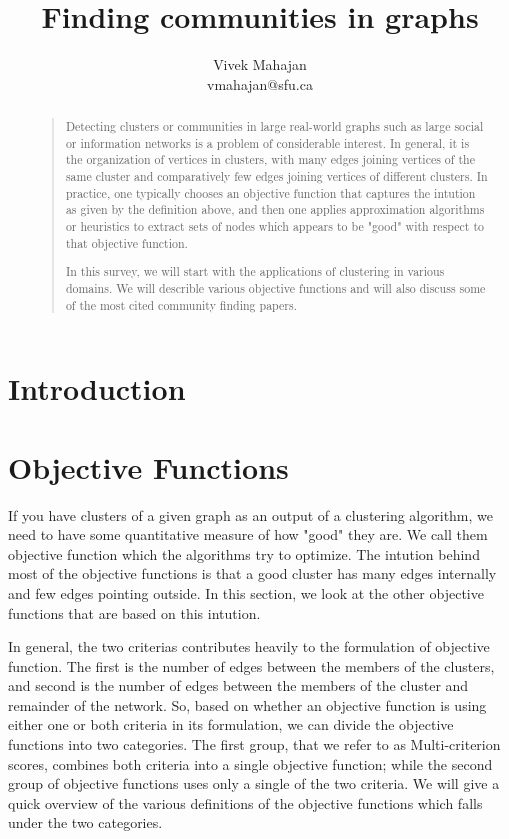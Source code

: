 \documentclass[letterpaper]{article}
\begin{document}
%
\title{Finding communities in graphs}
\author{Vivek Mahajan\\
vmahajan@sfu.ca\\
}
\maketitle
\begin{abstract}
\begin{quote}
Detecting clusters or communities in large real-world graphs such as large social or information networks is a problem of considerable interest. In general, it is the 
organization of vertices in clusters, with many edges joining vertices of the same cluster and comparatively few edges joining vertices of different clusters. 
In practice, one typically chooses an objective function that captures the intution as given by the definition above, and then one applies approximation algorithms
or heuristics to extract sets of nodes which appears to be "good" with respect to that objective function.

In this survey, we will start with the applications of clustering in various domains. We will describle various objective functions and will also discuss some of the
most cited community finding papers. 

\end{quote}
\end{abstract}

\section{Introduction}

\section{Objective Functions}
If you have clusters of a given graph as an output of a clustering algorithm, we need to have some quantitative measure of how "good" they are. We call them objective
function which the algorithms try to optimize. The intution behind most of the objective functions is that a good cluster has many edges internally and few edges 
pointing outside. In this section, we look at the other objective functions that are based on this intution.


In general, the two criterias contributes heavily to the formulation of objective function. The first is the number of edges between the members of the clusters, and 
second is the number of edges between the members of the cluster and remainder of the network. So, based on whether an objective function is using either one or both 
criteria in its formulation, we can divide the objective functions into two categories\cite{leskovec2010}. The first group, that we refer to as Multi-criterion scores, combines both 
criteria into a single objective function; while the second group of objective functions uses only  a single of the two criteria. We will give a quick overview of the
various definitions of the objective functions which falls under the two categories. 
\end{document}
